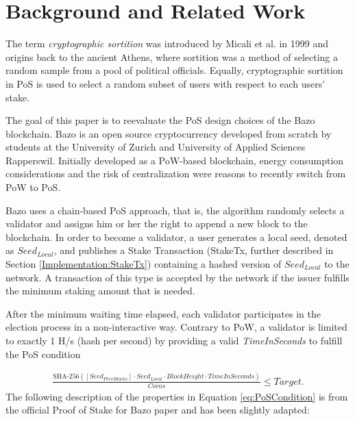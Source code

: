 \documentclass[12pt,a4]{article}
\begin{document}
\section{Background and Related Work}
\label{Background}

The term \textit{cryptographic sortition} was introduced by Micali et al. \cite{Micali99} in 1999 and origins back to the ancient Athens, where sortition was a method of selecting a random sample from a pool of political officials. Equally, cryptographic sortition in PoS is used to select a random subset of users with respect to each users' stake. 

The goal of this paper is to reevaluate the PoS design choices of the Bazo blockchain. Bazo \cite{Sgier17, Bachmann18} is an open source cryptocurrency developed from scratch by students at the University of Zurich and University of Applied Sciences Rapperswil. Initially developed as a PoW-based blockchain, energy consumption considerations and the risk of centralization were reasons to recently switch from PoW to PoS. 

Bazo uses a chain-based PoS approach, that is, the algorithm randomly selects a validator and assigns him or her the right to append a new block to the blockchain. In order to become a validator, a user generates a local seed, denoted as $Seed_{Local}$, and publishes a Stake Transaction (StakeTx, further described in Section \ref{Implementation:StakeTx}) containing a hashed version of $Seed_{Local}$ to the network. A transaction of this type is accepted by the network if the issuer fulfills the minimum staking amount that is needed.

After the minimum waiting time elapsed, each validator participates in the election process in a non-interactive way. Contrary to PoW, a validator is limited to exactly 1 H/s (hash per second) by providing a valid \textit{TimeInSeconds} to fulfill the PoS condition

\begin{gather}
\label{eq:PoSCondition}
  {\frac{\text{SHA-256}([Seed_{PrevBlocks}] \cdot Seed_{Local} \cdot BlockHeight \cdot TimeInSeconds)}{Coins}} \leq Target.
\end{gather}
The following description of the properties in Equation \ref{eq:PoSCondition} is from the official Proof of Stake for Bazo paper \cite{Bachmann18} and has been slightly adapted: 
\end{document}
